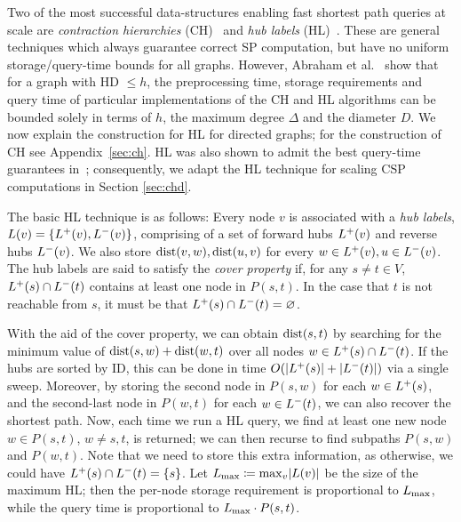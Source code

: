 Two of the most successful data-structures enabling fast shortest path queries at scale are \emph{contraction hierarchies} (CH)~\cite{geisberger_ch_definition} and \emph{hub labels} (HL)~\cite{cohen_definition_hl}.
These are general techniques which always guarantee correct SP computation, but have no uniform storage/query-time bounds for all graphs.
However, Abraham et al.~\cite{highway2013} show that for a graph with HD $\leq h$, the preprocessing time, storage requirements and query time of particular implementations of the CH and HL algorithms can be bounded solely in terms of $h$, the maximum degree $\Delta$ and the diameter $D$. 
We now explain the construction for HL for directed graphs; for the construction of CH see Appendix~\ref{sec:ch}.
HL was also shown to admit the best query-time guarantees in~\cite{highway2013}; consequently, we adapt the HL technique for scaling CSP computations in Section \ref{sec:chd}.

The basic HL technique is as follows:
Every node $v$ is associated with a \emph{hub labels}, $L(v) = \crl*{\Lf(v),\Lb(v)}$, comprising of a set of forward hubs $\Lf(v)$ and reverse hubs $\Lb(v)$.
We also store $\dist(v,w),\dist(u,v)$ for every $w\in\Lf(v),u\in\Lb(v)$.
The hub labels are said to satisfy the \emph{cover property} if, for any $s\neq t\in V$, $\Lf(s)\cap\Lb(t)$ contains at least one node in $P(s,t)$.
In the case that $t$ is not reachable from $s$, it must be that $\Lf(s)\cap\Lb(t)=\varnothing$.

With the aid of the cover property, we can obtain $\dist(s,t)$ by searching for the minimum value of $\dist(s,w)+\dist(w,t)$ over all nodes $w\in\Lf(s)\cap\Lb(t)$.
If the hubs are sorted by ID, this can be done in time $\Or(\card{\Lf(s)}+\card{\Lb(t)})$ via a single sweep.
Moreover, by storing the second node in $P(s,w)$ for each $w\in \Lf(s)$, and the second-last node in $P(w,t)$ for each $w\in \Lb(t)$, we can also recover the shortest path.
Now, each time we run a HL query, we find at least one new node $w\in P(s,t)$, $w\neq s,t$, is returned; we can then recurse to find subpaths $P(s,w)$ and $P(w,t)$.
Note that we need to store this extra information, as otherwise, we could have $\Lf(s)\cap\Lb(t)=\{s\}$.
Let $\Lm \defeq \max_v\abs*{L(v)}$ be the size of the maximum HL; then the per-node storage requirement is proportional to $\Lm$, while the query time is proportional to $\Lm\cdot P(s,t)$.


